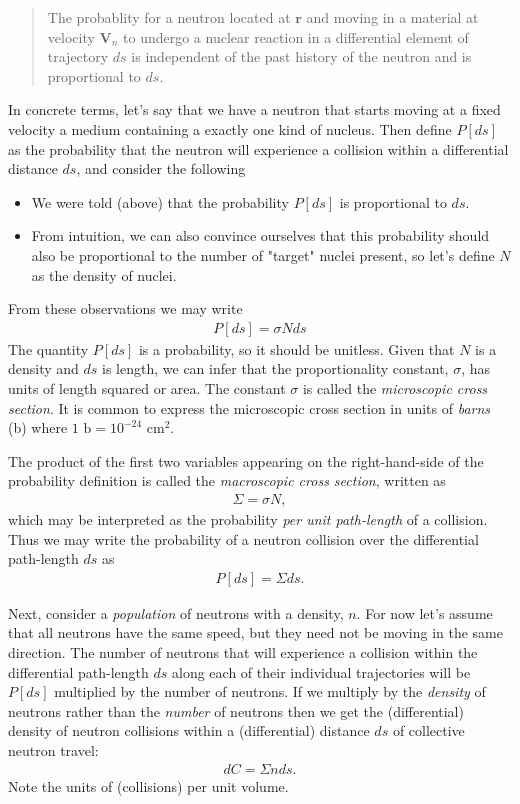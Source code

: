 \documentclass[11pt]{article}
\renewcommand\vec{\mathbf}
\begin{document}
\begin{quote}
The probablity for a neutron located at \(\vec{r}\) and moving in a material at velocity \(\vec{V}_n\) to undergo a nuclear reaction in a differential element of trajectory \(ds\) is independent of the past history of the neutron and is proportional to \(ds\).
\end{quote}

In concrete terms, let's say that we have a  neutron that starts moving at a fixed velocity a medium  containing a exactly one kind of nucleus.  Then define \(P[ds]\) as the probability that the neutron will experience a collision within a differential distance \(ds\), and consider the following
\begin{itemize}
\item We were told (above) that the probability \(P[ds]\) is proportional to \(ds\).
\item From intuition, we can also convince ourselves that this probability should also be proportional to the number of "target" nuclei present, so let's define \(N\) as the density of nuclei.
\end{itemize}
From these observations we may write
\begin{align}
  P[ds] = \sigma N ds
\end{align}
The quantity \(P[ds]\) is a probability, so it should be unitless.  Given that \(N\) is a density and \(ds\) is length, we can infer that the proportionality constant, \(\sigma\), has units of length squared or area.  The constant \(\sigma\) is called the \emph{microscopic cross section}.  It is common to express the microscopic cross section in units of \emph{barns} (b) where \(1 \text{ b} = 10^{-24} \text{ cm}^2\).

The product of the first two variables appearing on the right-hand-side of the probability definition is called the \emph{macroscopic cross section}, written as
\begin{align}
  \Sigma = \sigma N,
\end{align}
which may be interpreted as the probability \emph{per unit path-length} of a collision.  Thus we may write the probability of a neutron collision over the differential path-length \(ds\) as
\begin{align}
  P[ds] = \Sigma ds.
\end{align}

Next, consider a \emph{population} of neutrons with a density, \(n\).  For now let's assume that all neutrons have the same speed, but they need not be moving in the same direction.  The number of neutrons that will experience a collision within the differential path-length \(ds\) along each of their individual trajectories will be \(P[ds]\) multiplied by the number of neutrons.  If we multiply by the \emph{density} of neutrons rather than the \emph{number} of neutrons then we get the (differential) density of neutron collisions within a (differential) distance \(ds\) of collective neutron travel:
\begin{align}
  dC = \Sigma n ds.
\end{align}
Note the units of (collisions) per unit volume.
\end{document}
